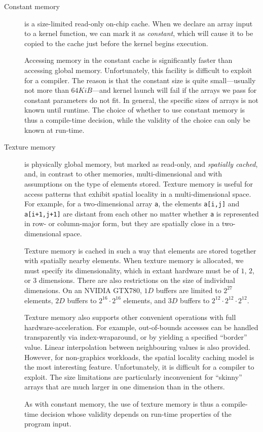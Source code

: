 \begin{description}
\item[Constant memory] is a size-limited read-only on-chip cache.
  When we declare an array input to a kernel function, we can mark it
  as \textit{constant}, which will cause it to be copied to the cache
  just before the kernel begins execution.

  Accessing memory in the constant cache is significantly faster than
  accessing global memory.  Unfortunately, this facility is difficult
  to exploit for a compiler.  The reason is that the constant size is
  quite small---usually not more than $64KiB$---and kernel launch will
  fail if the arrays we pass for constant parameters do not fit.  In
  general, the specific sizes of arrays is not known until runtime.
  The choice of whether to use constant memory is thus a compile-time
  decision, while the validity of the choice can only be known at
  run-time.

\item[Texture memory] is physically global memory, but marked as
  read-only, and \textit{spatially cached}, and, in contrast to other
  memories, multi-dimensional and with assumptions on the type of
  elements stored.  Texture memory is useful for access patterns that
  exhibit spatial locality in a multi-dimensional space.  For example,
  for a two-dimensional array \texttt{a}, the elements \texttt{a[i,j]}
  and \texttt{a[i+1,j+1]} are distant from each other no matter
  whether \texttt{a} is represented in row- or column-major form, but
  they are spatially close in a two-dimensional space.

  Texture memory is cached in such a way that elements are stored
  together with spatially nearby elements.  When texture memory is
  allocated, we must specify its dimensionality, which in extant
  hardware must be of $1$, $2$, or $3$ dimensions.  There are also
  restrictions on the size of individual dimensions.  On an NVIDIA
  GTX780, $1D$ buffers are limited to $2^{27}$ elements, $2D$ buffers
  to $2^{16}\cdot{}2^{16}$ elements, and $3D$ buffers to
  $2^{12}\cdot{}2^{12}\cdot{}2^{12}$.

  Texture memory also supports other convenient operations with full
  hardware-acceleration.  For example, out-of-bounds accesses can be
  handled transparently via index-wraparound, or by yielding a
  specified ``border'' value.  Linear interpolation between
  neighbouring values is also provided.  However, for non-graphics
  workloads, the spatial locality caching model is the most
  interesting feature.  Unfortunately, it is difficult for a compiler
  to exploit.  The size limitations are particularly inconvenient for
  ``skinny'' arrays that are much larger in one dimension than in the
  others.

  As with constant memory, the use of texture memory is thus a
  compile-time decision whose validity depends on run-time properties
  of the program input.
\end{description}

